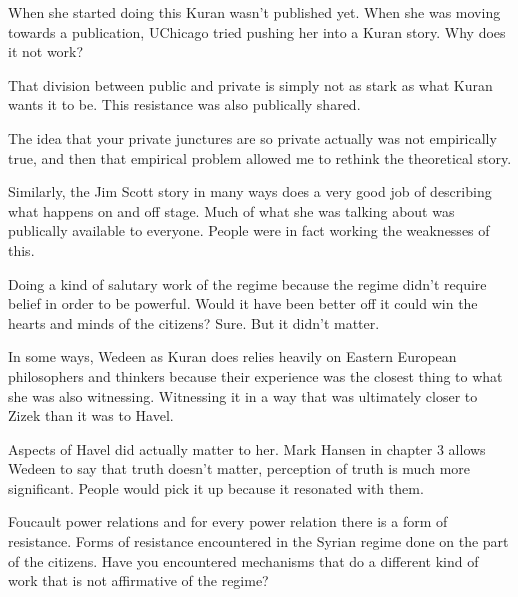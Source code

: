 \documentclass{article}
\begin{document}
When she started doing this Kuran wasn't published yet.  When she was moving towards a publication, UChicago tried pushing her into a Kuran story.  Why does it not work?  

\vspace{5mm}

That division between public and private is simply not as stark as what Kuran wants it to be.  This resistance was also publically shared.  

\vspace{5mm}

The idea that your private junctures are so private actually was not empirically true, and then that empirical problem allowed me to rethink the theoretical story.  

\vspace{5mm}

Similarly, the Jim Scott story in many ways does a very good job of describing what happens on and off stage.  Much of what she was talking about was publically available to everyone.  People were in fact working the weaknesses of this.  

\vspace{5mm}

Doing a kind of salutary work of the regime because the regime didn't require belief in order to be powerful.  Would it have been better off it could win the hearts and minds of the citizens?  Sure.  But it didn't matter.  

\vspace{5mm}

In some ways, Wedeen as Kuran does relies heavily on Eastern European philosophers and thinkers because their experience was the closest thing to what she was also witnessing.  Witnessing it in a way that was ultimately closer to Zizek than it was to Havel.  

\vspace{5mm}

Aspects of Havel did actually matter to her.  Mark Hansen in chapter 3 allows Wedeen to say that truth doesn't matter, perception of truth is much more significant.  People would pick it up because it resonated with them.  

\vspace{5mm}

Foucault power relations and for every power relation there is a form of resistance.  Forms of resistance encountered in the Syrian regime done on the part of the citizens.  Have you encountered mechanisms that do a different kind of work that is not affirmative of the regime?  
\end{document}
